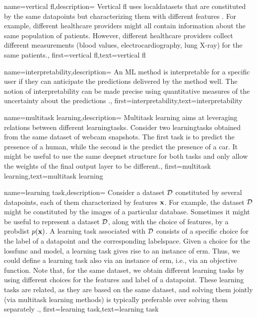 {name={vertical \gls{fl}},description=
	{Vertical \gls{fl} uses \gls{localdataset}s that are constituted 
	 by the same \gls{datapoint}s but characterizing them with different \gls{feature}s \cite{VFLChapter}. 
     For example, different healthcare providers might all contain information 
     about the same population of patients. However, different healthcare providers 
     collect different measurements (blood values, electrocardiography, lung X-ray) 
     for the same patients.},
	first={vertical \gls{fl}},text={vertical \gls{fl}}
} 

{name={interpretability},description=
		{An ML method is interpretable for a specific user if 
			they can anticipate the \gls{prediction}s delivered by the method well. 
			The notion of interpretability can be made precise using quantitative 
			measures of the uncertainty about the \gls{prediction}s \cite{JunXML2020}.},
		first={interpretability},text={interpretability}
}

{name={multitask learning},description=
	{Multitask learning aims at leveraging relations between 
	 different \gls{learningtask}s. Consider two \gls{learningtask}s obtained from the 
	 same \gls{dataset} of webcam snapshots. The first task is to predict the presence 
	 of a human, while the second is the predict the presence of a car. It might be useful 
	 to use the same \gls{deepnet} structure for both tasks and only allow the weights of 
	 the final output layer to be different.},
	first={multitask learning},text={multitask learning}
}

{name={learning task},description=
	{Consider a \gls{dataset} $\mathcal{D}$ constituted by several \gls{datapoint}s, each of them 
	 characterized by \gls{feature}s ${\bf x}$. For example, the \gls{dataset} $\mathcal{D}$ 
	 might be constituted by the images of a particular database. Sometimes it might be useful 
	 to represent a \gls{dataset} $\mathcal{D}$, along with the choice of \gls{feature}s, by a \gls{probdist} $p({\bf x})$. 
	 A learning task associated with $\mathcal{D}$ consists of a specific 
	 choice for the \gls{label} of a \gls{datapoint} and the corresponding \gls{labelspace}. 
	 Given a choice for the \gls{lossfunc} and \gls{model}, a learning task gives rise to an 
	 instance of \gls{erm}. Thus, we could define a learning task also via an instance of \gls{erm}, i.e., 
	 via an objective function.  Note that, for the same \gls{dataset}, we obtain different learning tasks by using 
	 different choices for the \gls{feature}s and \gls{label} of a \gls{datapoint}. These learning 
	 tasks are related, as they are based on the same \gls{dataset}, and solving them jointly 
	 (via multitask learning methods) is typically preferable over solving them separately \cite{Caruana:1997wk,JungGaphLassoSPL,CSGraphSelJournal}.},
	first={learning task},text={learning task}
}

